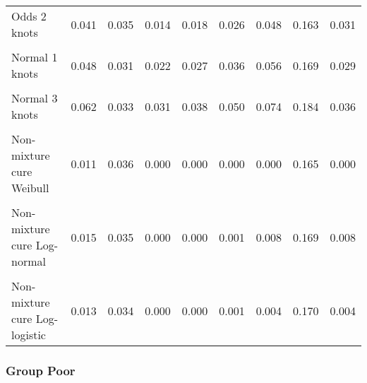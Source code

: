 \documentclass[
]{article}
\begin{document}
\begin{table}[H]
{\begin{tabular}[t]{lrrrrrrrr}
Odds 2 knots & 0.041 & 0.035 & 0.014 & 0.018 & 0.026 & 0.048 & 0.163 & 0.031\\
\cellcolor{gray!10}{Odds 3 knots} & \cellcolor{gray!10}{0.046} & \cellcolor{gray!10}{0.037} & \cellcolor{gray!10}{0.016} & \cellcolor{gray!10}{0.021} & \cellcolor{gray!10}{0.031} & \cellcolor{gray!10}{0.057} & \cellcolor{gray!10}{0.175} & \cellcolor{gray!10}{0.036}\\
Normal 1 knots & 0.048 & 0.031 & 0.022 & 0.027 & 0.036 & 0.056 & 0.169 & 0.029\\
\cellcolor{gray!10}{Normal 2 knots} & \cellcolor{gray!10}{0.049} & \cellcolor{gray!10}{0.031} & \cellcolor{gray!10}{0.023} & \cellcolor{gray!10}{0.028} & \cellcolor{gray!10}{0.037} & \cellcolor{gray!10}{0.058} & \cellcolor{gray!10}{0.168} & \cellcolor{gray!10}{0.030}\\
Normal 3 knots & 0.062 & 0.033 & 0.031 & 0.038 & 0.050 & 0.074 & 0.184 & 0.036\\
\cellcolor{gray!10}{Mixture cure Weibull} & \cellcolor{gray!10}{0.011} & \cellcolor{gray!10}{0.036} & \cellcolor{gray!10}{0.000} & \cellcolor{gray!10}{0.000} & \cellcolor{gray!10}{0.000} & \cellcolor{gray!10}{0.000} & \cellcolor{gray!10}{0.166} & \cellcolor{gray!10}{0.000}\\
Non-mixture cure Weibull & 0.011 & 0.036 & 0.000 & 0.000 & 0.000 & 0.000 & 0.165 & 0.000\\
\cellcolor{gray!10}{Mixture cure Log-normal} & \cellcolor{gray!10}{0.016} & \cellcolor{gray!10}{0.036} & \cellcolor{gray!10}{0.000} & \cellcolor{gray!10}{0.000} & \cellcolor{gray!10}{0.001} & \cellcolor{gray!10}{0.007} & \cellcolor{gray!10}{0.167} & \cellcolor{gray!10}{0.006}\\
Non-mixture cure Log-normal & 0.015 & 0.035 & 0.000 & 0.000 & 0.001 & 0.008 & 0.169 & 0.008\\
\cellcolor{gray!10}{Mixture cure Log-logistic} & \cellcolor{gray!10}{0.014} & \cellcolor{gray!10}{0.035} & \cellcolor{gray!10}{0.000} & \cellcolor{gray!10}{0.000} & \cellcolor{gray!10}{0.001} & \cellcolor{gray!10}{0.005} & \cellcolor{gray!10}{0.170} & \cellcolor{gray!10}{0.004}\\
Non-mixture cure Log-logistic & 0.013 & 0.034 & 0.000 & 0.000 & 0.001 & 0.004 & 0.170 & 0.004\\
\bottomrule
\end{tabular}}
\end{table}

\clearpage

\subsubsection{Group Poor}\label{group-poor}
\end{document}
